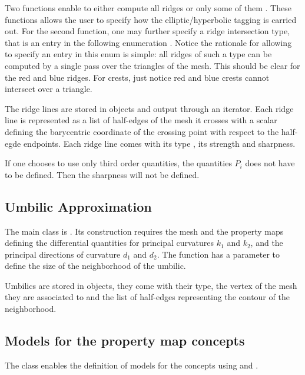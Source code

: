 Two functions enable to either compute all ridges
 or only some of them
. 
These functions allows the user to specify how the elliptic/hyperbolic
tagging is carried out.  For the second function, one may further
specify a ridge intersection type, that is an entry in the following
enumeration . 
Notice the rationale for allowing to specify an entry in this enum is
simple: all ridges of such a type can be computed by a single pass
over the triangles of the mesh. This should be clear for the red and
blue ridges. For crests, just notice red and blue crests cannot
intersect over a triangle.
\medskip



The ridge lines are stored in
 objects and output through an iterator. 
Each ridge line is represented as a list of half-edges of the mesh it
crosses with a scalar defining the barycentric coordinate of the
crossing point with respect to the half-egde endpoints. Each ridge
line comes with its type , its strength and sharpness.

If one chooses to use only third order quantities, the quantities
$P_i$ does not have to be defined. Then the sharpness will not be
defined.

\subsection{Umbilic Approximation}
The main class is
.
Its construction requires the mesh and the property maps defining the
differential quantities for principal curvatures $k_1$ and $k_2$, and
the principal directions of curvature $d_1$ and $d_2$.  The function
 has a parameter to define the size of the neighborhood of the umbilic.

Umbilics are stored in  objects, they come with their
type, the vertex of the mesh they are associated to and the list of
half-edges representing the contour of the neighborhood.


\subsection{Models for the property map concepts}
The class
enables the definition of models for the concepts
using  and .


